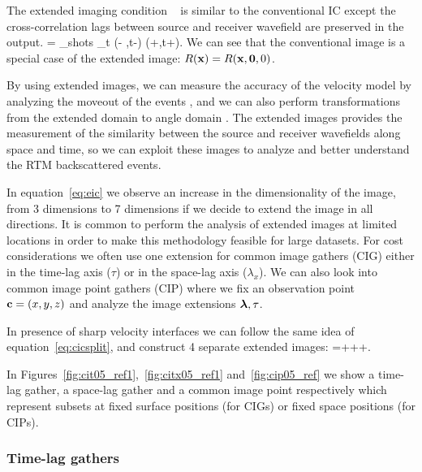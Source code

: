 The extended imaging condition ~\citep{sava:S209} is similar to the conventional IC except the cross-correlation
lags between source and receiver wavefield are preserved in the output.
\beq
\Re= \sum_{shots} \sum_{t} \US(\xx - \hh,t-\tau) \UR(\xx+\hh,t+\tau).
\label{eq:eic}
\eeq
%
We can see that the conventional image is a special case of the extended image: $R({\bf x})=R({\bf x},{\bf 0},0)$.

By using extended images, we can measure the accuracy of the velocity model by analyzing the moveout of the events
 \citep{yang:S151}, and we can also perform transformations from the extended domain to angle domain 
\citep{sava:S209,sava:1065,sava:S131}. The extended  images provides the measurement of the similarity between the source
 and receiver wavefields along space and time, so we can exploit these images to analyze and better understand the RTM backscattered events.

In equation~\ref{eq:eic} we observe an increase in the dimensionality of the image, from 3 dimensions to 7 dimensions
if we decide to extend the image in all directions. It is common to perform the analysis 
of extended images at limited locations in order to make this methodology feasible for large datasets. 
For cost considerations we often use one extension for common image gathers (CIG) either
in the time-lag axis ($\tau$) or in the space-lag axis ($\lambda_x$). We can also look into common image point gathers (CIP) where we 
fix an observation point ${\bf c}=(x,y,z)$ and analyze the image extensions ${\boldsymbol{\lambda}},\tau$. 

In presence of sharp velocity interfaces we can follow the same idea of equation~\ref{eq:cicsplit}, and construct 4 separate 
extended images:
\beq
\Re=+++.
\label{eq:eicsplit}
\eeq

In Figures~\ref{fig:cit05_ref1},~\ref{fig:citx05_ref1} and~\ref{fig:cip05_ref} we show a time-lag gather, a space-lag gather
 and a common image point respectively which represent subsets at fixed surface positions (for CIGs) or fixed space positions 
(for CIPs).


\subsubsection{Time-lag gathers}

